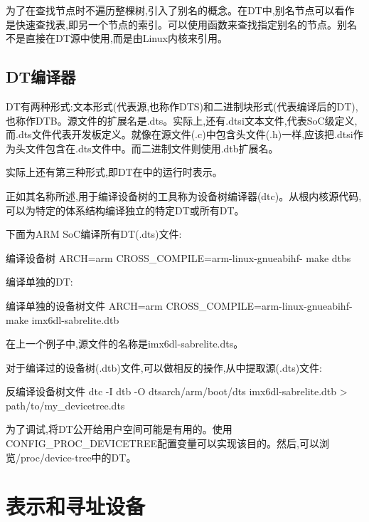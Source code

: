 \documentclass[lang=cn,newtx,10pt,scheme=chinese]{elegantbook}
\begin{document}
为了在查找节点时不遍历整棵树,引入了别名的概念。在DT中,别名节点可以看作是快速查找表,即另一个节点的索引。可以使用函数来查找指定别名的节点。别名不是直接在DT源中使用,而是由Linux内核来引用。

\subsection{DT编译器}

DT有两种形式:文本形式(代表源,也称作DTS)和二进制块形式(代表编译后的DT),也称作DTB。源文件的扩展名是.dts。实际上,还有.dtsi文本文件,代表SoC级定义,而.dts文件代表开发板定义。就像在源文件(.c)中包含头文件(.h)一样,应该把.dtsi作为头文件包含在.dts文件中。而二进制文件则使用.dtb扩展名。

实际上还有第三种形式,即DT在中的运行时表示。

正如其名称所述,用于编译设备树的工具称为设备树编译器(dtc)。从根内核源代码,可以为特定的体系结构编译独立的特定DT或所有DT。

下面为ARM SoC编译所有DT(.dts)文件:

\begin{mycode}{编译设备树}
ARCH=arm CROSS_COMPILE=arm-linux-gnueabihf- make dtbs
\end{mycode}

编译单独的DT:

\begin{mycode}{编译单独的设备树文件}
ARCH=arm CROSS_COMPILE=arm-linux-gnueabihf- make imx6dl-sabrelite.dtb
\end{mycode}

在上一个例子中,源文件的名称是imx6dl-sabrelite.dts。

对于编译过的设备树(.dtb)文件,可以做相反的操作,从中提取源(.dts)文件:

\begin{mycode}{反编译设备树文件}
dtc -I dtb -O dtsarch/arm/boot/dts imx6dl-sabrelite.dtb > path/to/my_devicetree.dts
\end{mycode}

\begin{marker}
为了调试,将DT公开给用户空间可能是有用的。使用CONFIG\_PROC\_DEVICETREE配置变量可以实现该目的。然后,可以浏览/proc/device-tree中的DT。
\end{marker}

\section{表示和寻址设备}
\end{document}
